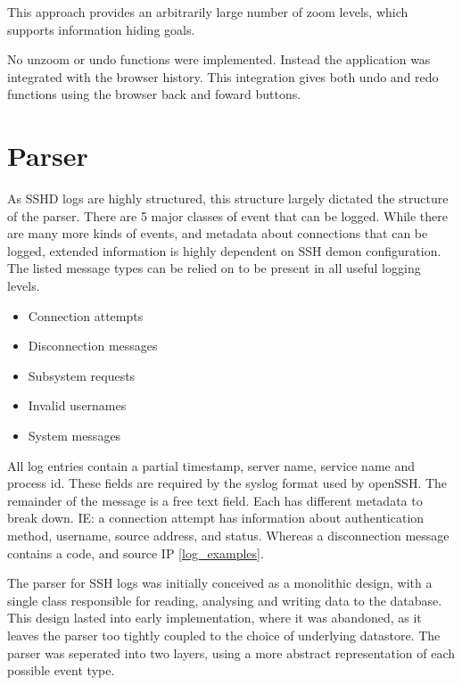 This approach provides an arbitrarily large number of zoom levels, which supports information hiding goals.

No unzoom or undo functions were implemented. Instead the application was integrated with the browser history. This integration gives both undo and redo functions using the browser back and foward buttons. 

\section{Parser}\label{parser}

As SSHD logs are highly structured, this structure largely dictated the structure of the parser. There are 5 major classes of event that can be logged. While there are many more kinds of events, and metadata about connections that can be logged, extended information is highly dependent on SSH demon configuration. The listed message types can be relied on to be present in all useful logging levels. 
\begin{itemize}
\item{Connection attempts}
\item{Disconnection messages}
\item{Subsystem requests}
\item{Invalid usernames}
\item{System messages}
\end{itemize}

All log entries contain a partial timestamp, server name, service name and process id. These fields are required by the syslog format used by openSSH. The remainder of the message is a free text field. Each has different metadata to break down. IE:  a connection attempt has information about authentication method, username, source address, and status. Whereas a disconnection message contains a code, and source IP \ref{log_examples}.

The parser for SSH logs was initially conceived as a monolithic design, with a single class responsible for reading, analysing and writing data to the database. This design lasted into early implementation, where it was abandoned, as it leaves the parser too tightly coupled to the choice of underlying datastore. The parser was seperated into two layers, using a more abstract representation of each possible event type.

